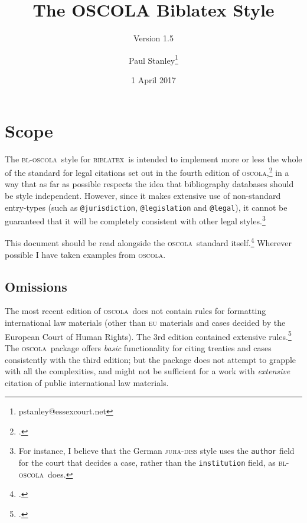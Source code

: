 \documentclass[a4paper,
               11pt,
	       DIV=1,			   
	       footinclude=false]
	      {scrartcl}
\def\releasedate{1 April 2017}
\def\versionnumber{1.5}
\newcommand{\oscola}{\textsc{bl-oscola}}
\newcommand{\biblatex}{\textsc{biblatex}}
\newcommand{\oscolashort}{\textsc{oscola}\nocite{oscola}}
\begin{document}
\title{The OSCOLA Biblatex Style}
\subtitle{Version \versionnumber}

\author{Paul Stanley\thanks{pstanley@essexcourt.net}}

\date{\releasedate}

\maketitle

\tableofcontents

\clearpage

\section{Scope}

The \oscola\ style for \biblatex\
is intended to implement more or less the whole of the standard for
legal citations set out in the fourth edition of
\oscolashort,\footcite{oscola} in a way that as far as possible
respects the idea that bibliography databases should be style
independent. However, since it
makes extensive use of non-standard entry-types (such as
\texttt{@jurisdiction}, \texttt{@legislation} and \texttt{@legal}), it
cannot be guaranteed that it will be completely consistent with other
legal styles.\footnote{For instance, I believe that the German
  \textsc{jura-diss} style uses the \texttt{author} field for the
  court that decides a case, rather than the \texttt{institution}
  field, as \oscola\ does.}

This document should be read alongside the \oscolashort\ standard
itself.\footcite{oscola} Wherever possible I have taken examples from
\oscolashort.

\subsection{Omissions\label{scope}}

 The most
recent edition of \oscolashort\ does not contain rules for formatting
international law materials (other than \textsc{eu} materials and
cases decided by the European Court of Human Rights). The 3rd edition
contained extensive rules.\footcite[25--37]{oscola3} The \oscolashort\
package offers \emph{basic} functionality for citing treaties and cases
consistently with the third edition; but the package does not attempt
to grapple with all the complexities, and might not be sufficient for
a work with \emph{extensive} citation of public international law
materials.
\end{document}
